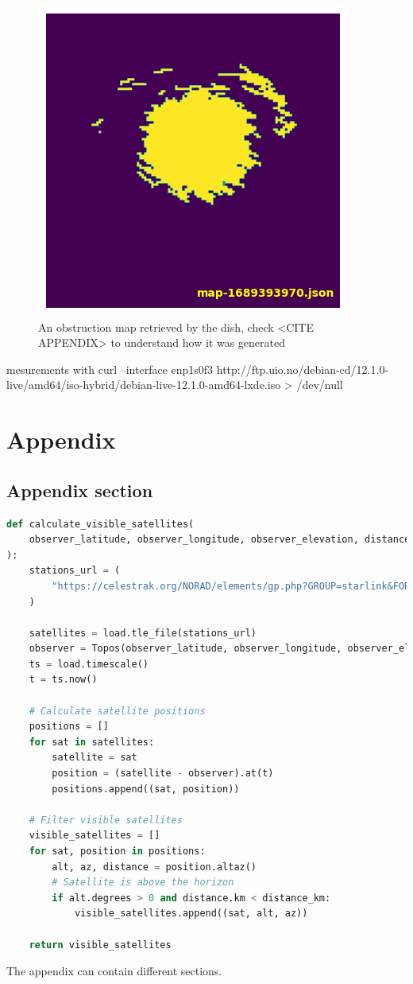 \documentclass[IN,11pt,twoside,openright,bachelor,english]{tumthesis}
\begin{document}
\begin{figure}
	\centering
	\includegraphics[]{img/obstruction_map_finale.png}
	\caption{An obstruction map retrieved by the dish, check <CITE APPENDIX> to understand how it was generated}
\end{figure}


mesurements with  curl --interface enp1s0f3 http://ftp.uio.no/debian-cd/12.1.0-live/amd64/iso-hybrid/debian-live-12.1.0-amd64-lxde.iso > /dev/null

\appendix
\chapter{Appendix}
\label{chap:appendix}

\section{Appendix section}

\begin{lstlisting}[language=python,caption={the \texttt{calculate\_visible\_satellites} function},captionpos=b]
def calculate_visible_satellites(
    observer_latitude, observer_longitude, observer_elevation, distance_km
):
    stations_url = (
        "https://celestrak.org/NORAD/elements/gp.php?GROUP=starlink&FORMAT=tle"
    )

    satellites = load.tle_file(stations_url)
    observer = Topos(observer_latitude, observer_longitude, observer_elevation)
    ts = load.timescale()
    t = ts.now()

    # Calculate satellite positions
    positions = []
    for sat in satellites:
        satellite = sat
        position = (satellite - observer).at(t)
        positions.append((sat, position))

    # Filter visible satellites
    visible_satellites = []
    for sat, position in positions:
        alt, az, distance = position.altaz()
        # Satellite is above the horizon
        if alt.degrees > 0 and distance.km < distance_km:
            visible_satellites.append((sat, alt, az))

    return visible_satellites
\end{lstlisting}

The appendix can contain different sections.

\clearpage
\pagestyle{thesischapter}

\cleardoublepage
{}

\printbibliography[heading=bibintoc]
\clearpage
\pagestyle{empty}
\end{document}

